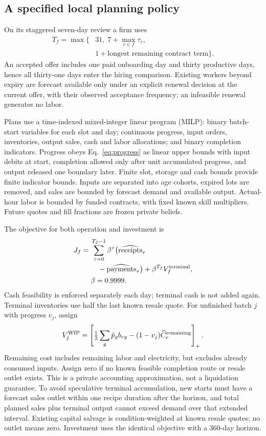 \documentclass[10pt,a4paper,twocolumn]{article}
\begin{document}
\subsection{A specified local planning policy}
On its staggered seven-day review a firm uses
\begin{equation}
\begin{aligned}
 T_f=\max\bigl\{&31,\; 7+\max_{r\in f}\tau_r,\\
 &1+\text{longest remaining contract term}\bigr\}.
\end{aligned}
\end{equation}
An accepted offer includes one paid onboarding day and thirty productive
days, hence all thirty-one days enter the hiring comparison. Existing
workers beyond expiry are forecast available only under an explicit
renewal decision at the current offer, with their observed acceptance
frequency; an infeasible renewal generates no labor.

Plans use a time-indexed mixed-integer linear program (MILP): binary
batch-start variables for each slot and day; continuous progress, input
orders, inventories, output sales, cash and labor allocations; and binary
completion indicators. Progress obeys Eq.~\eqref{eq:progress} as linear
upper bounds with input debits at start, completion allowed only after
unit accumulated progress, and output released one boundary later.
Finite slot, storage and cash bounds provide finite indicator bounds.
Inputs are separated into age cohorts, expired lots are removed, and
sales are bounded by forecast demand and available output. Actual-hour
labor is bounded by funded contracts, with fixed known skill multipliers.
Future quotes and fill fractions are frozen private beliefs.

The objective for both operation and investment is
\begin{equation}
\begin{aligned}
 J_f={}&\sum_{\tau=0}^{T_f-1}\beta^\tau
       \bigl(\widehat{\mathrm{receipts}}_\tau\\
       &\quad-\widehat{\mathrm{payments}}_\tau\bigr)
       +\beta^{T_f}V_f^{\rm terminal},\\
 &\beta=0.9999.
\end{aligned}
\label{eq:firmplan}
\end{equation}
Cash feasibility is enforced separately each day; terminal cash is not
added again. Terminal inventories use half the last known resale quote.
For unfinished batch $j$ with progress $v_j$, assign
\[
 V_j^{\rm WIP}=\left[
 \tfrac12\sum_g\hat p_g b_{rg}
 -(1-v_j)\widehat C_r^{\rm remaining}\right]_+ .
\]
Remaining cost includes remaining labor and electricity, but excludes
already consumed inputs. Assign zero if no known feasible completion
route or resale outlet exists. This is a private accounting approximation,
not a liquidation guarantee. To avoid speculative terminal accumulation,
new starts must have a forecast sales outlet within one recipe duration
after the horizon, and total planned sales plus terminal output cannot
exceed demand over that extended interval. Existing capital salvage is
condition-weighted at known resale quotes; no outlet means zero.
Investment uses the identical objective with a 360-day horizon.
\end{document}
